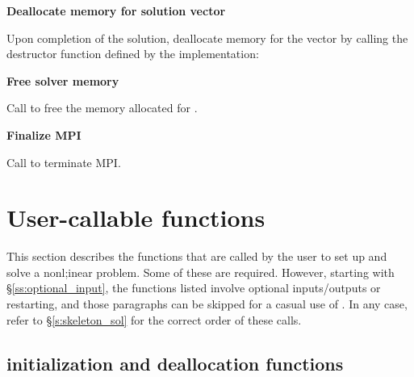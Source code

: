 \begin{Steps}
\item
  {\bf Deallocate memory for solution vector}

  Upon completion of the solution, deallocate memory for the vector 
  by calling the destructor function defined by the {\nvector} implementation:

  {\s} 

  {\p} 
  
\item
  {\bf Free solver memory}

  Call  to free the memory allocated for {\kinsol}.
  
\item 
  {\bf {\p} Finalize MPI}

  Call  to terminate MPI.
  
\end{Steps}


\section{User-callable functions}\label{s:kinsol_fct_sol}

This section describes the {\kinsol} functions that are called by the
user to set up and solve a nonl;inear problem. Some of these are required. However,
starting with \S\ref{ss:optional_input}, the functions listed involve
optional inputs/outputs or restarting, and those paragraphs can be
skipped for a casual use of {\kinsol}. In any case, refer to
\S\ref{s:skeleton_sol} for the correct order of these calls.


\subsection{{\kinsol} initialization and deallocation functions}\label{ss:kinmalloc}

